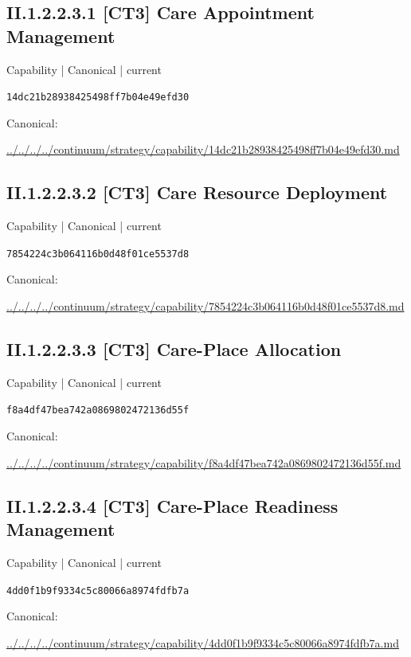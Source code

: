 \documentclass[10pt,a4paper]{article}
\begin{document}
\subsection*{II.1.2.2.3.1 [CT3] Care Appointment Management}
{\small Capability | Canonical | current}\par
\texttt{14dc21b28938425498ff7b04e49efd30}\par
Canonical: \par
{\footnotesize\url{../../../../continuum/strategy/capability/14dc21b28938425498ff7b04e49efd30.md}}\par
\subsection*{II.1.2.2.3.2 [CT3] Care Resource Deployment}
{\small Capability | Canonical | current}\par
\texttt{7854224c3b064116b0d48f01ce5537d8}\par
Canonical: \par
{\footnotesize\url{../../../../continuum/strategy/capability/7854224c3b064116b0d48f01ce5537d8.md}}\par
\subsection*{II.1.2.2.3.3 [CT3] Care-Place Allocation}
{\small Capability | Canonical | current}\par
\texttt{f8a4df47bea742a0869802472136d55f}\par
Canonical: \par
{\footnotesize\url{../../../../continuum/strategy/capability/f8a4df47bea742a0869802472136d55f.md}}\par
\subsection*{II.1.2.2.3.4 [CT3] Care-Place Readiness Management}
{\small Capability | Canonical | current}\par
\texttt{4dd0f1b9f9334c5c80066a8974fdfb7a}\par
Canonical: \par
{\footnotesize\url{../../../../continuum/strategy/capability/4dd0f1b9f9334c5c80066a8974fdfb7a.md}}\par
\end{document}
